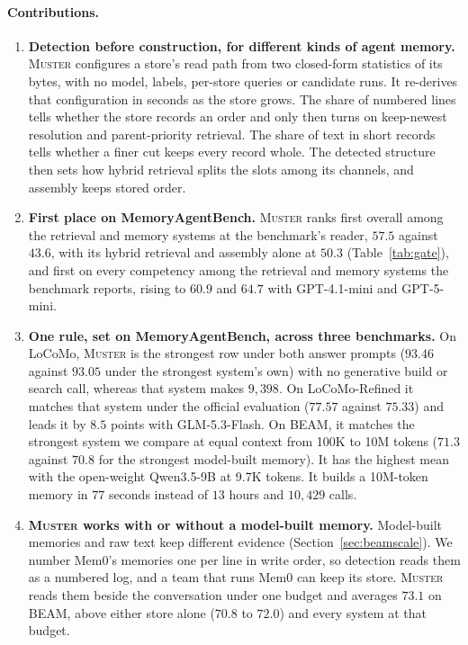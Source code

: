 \documentclass{article}
\newcommand{\sys}{\textsc{Muster}}
\begin{document}
\paragraph{Contributions.}
\begin{enumerate}[label=(\roman*),leftmargin=*,nosep]
\item \textbf{Detection before construction, for different kinds of agent memory.}
\sys{} configures a store's read path from two closed-form statistics of its bytes, with no model, labels, per-store queries or candidate runs. It re-derives that configuration in seconds as the store grows. The share of numbered lines tells whether the store records an order and only then turns on keep-newest resolution and parent-priority retrieval. The share of text in short records tells whether a finer cut keeps every record whole. The detected structure then sets how hybrid retrieval splits the slots among its channels, and assembly keeps stored order.
\item \textbf{First place on MemoryAgentBench.}
\sys{} ranks first overall among the retrieval and memory systems at the benchmark's reader, $57.5$ against $43.6$, with its hybrid retrieval and assembly alone at $50.3$ (Table~\ref{tab:gate}), and first on every competency among the retrieval and memory systems the benchmark reports, rising to $60.9$ and $64.7$ with GPT-4.1-mini and GPT-5-mini.
\item \textbf{One rule, set on MemoryAgentBench, across three benchmarks.}
On LoCoMo, \sys{} is the strongest row under both answer prompts ($93.46$ against $93.05$ under the strongest system's own) with no generative build or search call, whereas that system makes $9{,}398$. On LoCoMo-Refined it matches that system under the official evaluation ($77.57$ against $75.33$) and leads it by $8.5$ points with GLM-5.3-Flash. On BEAM, it matches the strongest system we compare at equal context from 100K to 10M tokens ($71.3$ against $70.8$ for the strongest model-built memory). It has the highest mean with the open-weight Qwen3.5-9B at 9.7K tokens. It builds a 10M-token memory in $77$ seconds instead of $13$ hours and $10{,}429$ calls.
\item \textbf{\sys{} works with or without a model-built memory.}
Model-built memories and raw text keep different evidence (Section~\ref{sec:beamscale}). We number Mem0's memories one per line in write order, so detection reads them as a numbered log, and a team that runs Mem0 can keep its store. \sys{} reads them beside the conversation under one budget and averages $73.1$ on BEAM, above either store alone ($70.8$ to $72.0$) and every system at that budget.
\end{enumerate}
\end{document}
